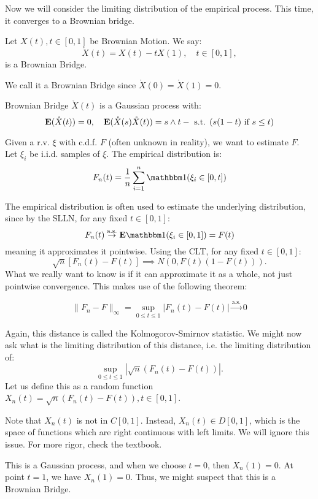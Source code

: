 \documentclass[../main/main.tex]{subfiles}
\begin{document}
Now we will consider the limiting distribution of the empirical process. This time, it converges to a Brownian bridge.

\begin{definition} Let $X(t) , t \in [0,1]$ be  Brownian Motion. We say: \[
		\mathring{X}(t) = X(t) - t X(1), \quad t \in[0,1],
	\] is a Brownian Bridge.
\end{definition}
\begin{remark}
	We call it a Brownian Bridge since $\mathring{X}(0) = \mathring{X}(1) = 0$.
\end{remark}
\begin{definition} Brownian Bridge $\mathring{X}(t)$ is a Gaussian process with: \[
		\text{\textbf{E}}(\mathring{X}(t)) = 0, \quad \text{\textbf{E}}(\mathring{X}(s) \mathring{X}(t)) = s \wedge t - \text{ s.t. } (s(1-t) \text{ if } s \leq t)
	\]
\end{definition}

\begin{definition} Given a r.v. $\xi$ with c.d.f. $F$ (often unknown in reality), we want to estimate $F$. Let $\xi_i$ be i.i.d. samples of $\xi$. The empirical distribution is: \[
		F_n(t) = \frac{1}{n} \sum\limits_{i=1}^{n} \ind (\xi_i \in [0,t])
	\]
\end{definition}

The empirical distribution is often used to estimate the underlying distribution, since by the SLLN, for any fixed $t \in [0,1]$: \[
	F_n(t) \overset{\text{a.s.}}{\to} \E \ind(\xi_i \in [0,1]) = F(t)
\] meaning it approximates it pointwise. Using the CLT, for any fixed $t \in [0,1]$: \[
	\sqrt{n} [F_n(t) - F(t)] \implies N(0, F(t)(1-F(t))).
\] What we really want to know is if it can approximate it as a whole, not just pointwise convergence. This makes use of the following theorem:
\begin{theorem} \[
		\|F_n - F\|_{\infty} = \sup\limits_{0 \leq t \leq 1} |F_n(t) - F(t) | \overset{\text{a.s.}}{\to} 0
	\]
\end{theorem}
Again, this distance is called the Kolmogorov-Smirnov statistic. We might now ask what is the limiting distribution of this distance, i.e. the limiting distribution of: \[
	\sup_{0 \leq t \leq 1} | \sqrt{n} (F_n(t)- F(t))|.
\]
Let us define this as a random function $X_n(t) = \sqrt{n} (F_n(t)- F(t)), t \in [0,1]$.
\begin{remark}
	Note that $X_n(t)$ is not in $C[0,1]$. Instead, $X_n(t) \in D[0,1]$, which is the space of functions which are right continuous with left limits.
	We will ignore this issue. For more rigor, check the textbook.
\end{remark}
This is a Gaussian process, and when we choose $t=0$, then $X_n(1) = 0$. At point $t=1$, we have $X_n(1) = 0$. Thus, we might suspect that this is a Brownian Bridge.
\end{document}
